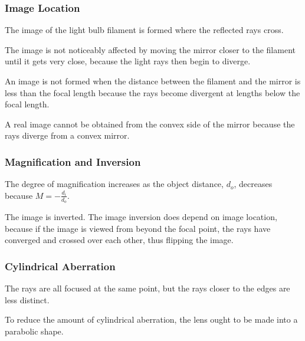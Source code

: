 \documentclass[12pt]{article}
\begin{document}
\subsubsection{Image Location}

\subsubsubsection{}

The image of the light bulb filament is formed where the reflected rays cross.

\subsubsubsection{}

The image is not noticeably affected by moving the mirror closer to the filament
until it gets very close, because the light rays then begin to diverge.

\subsubsubsection{}

An image is not formed when the distance between the filament and the mirror is
less than the focal length because the rays become divergent at lengths below
the focal length.

\subsubsubsection{}

A real image cannot be obtained from the convex side of the mirror because the
rays diverge from a convex mirror.

\subsubsection{Magnification and Inversion}

\subsubsubsection{}

The degree of magnification increases as the object distance, \(d_o\), decreases
because \(M = - \frac{d_i}{d_o}\).

\subsubsubsection{}

The image is inverted. The image inversion does depend on image location,
because if the image is viewed from beyond the focal point, the rays have
converged and crossed over each other, thus flipping the image.

\subsubsection{Cylindrical Aberration}

\subsubsubsection{}

The rays are all focused at the same point, but the rays closer to the edges are
less distinct.

\subsubsubsection{}

To reduce the amount of cylindrical aberration, the lens ought to be made into a
parabolic shape.

\end{document}
